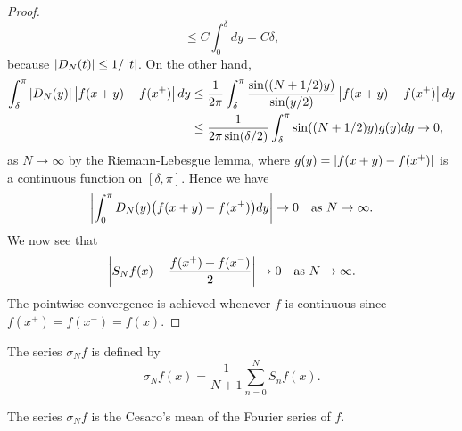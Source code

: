 \begin{proof}
\begin{equation*}
        \leq C\int_0^\delta dy = C\delta, 
    \end{equation*}
    because $\left\lvert {D_N(t)} \right\rvert\leq 1/\left\lvert {t} \right\rvert$. On the other hand, 
    \begin{equation*}
        \begin{split}
            \int_\delta^\pi \left\lvert {D_N(y)} \right\rvert\left\lvert {f(x+y)-f(x^+)} \right\rvert dy 
            &\leq \frac{1}{2\pi}\int_\delta^\pi \frac{\sin((N+1/2)y)}{\sin(y/2)}\left\lvert {f(x+y)-f(x^+)} \right\rvert dy \\
            &\leq \frac{1}{2\pi\sin(\delta/2)}\int_\delta^\pi \sin((N+1/2)y)g(y)dy \to 0,
        \end{split}
    \end{equation*}
    as $N\to\infty$ by the Riemann-Lebesgue lemma, where $g(y) = \left\lvert {f(x+y)-f(x^+)} \right\rvert$ 
    is a continuous function on $[\delta,\pi]$. Hence we have
    \begin{equation*}
        \abs{\int_0^\pi D_N(y)\pth{f(x+y)-f(x^+)}dy} \to 0 \quad \text{as } N\to\infty.
    \end{equation*}
    We now see that 
    \begin{equation*}
        \left\lvert {S_Nf(x) - \frac{f(x^+)+f(x^-)}{2}} \right\rvert \to 0 \quad \text{as } N\to\infty.
    \end{equation*}
    The pointwise convergence is achieved whenever $f$ is continuous since 
    $f(x^+)=f(x^-)=f(x)$.
\end{proof}

\begin{definition}
    The series $\sigma_Nf$ is defined by 
    \begin{equation*}
        \sigma_Nf(x) = \frac{1}{N+1}\sum_{n=0}^{N} S_nf(x).
    \end{equation*}
\end{definition}
\begin{remark}
    The series $\sigma_Nf$ is the Cesaro's mean of the Fourier series of $f$.
\end{remark}

